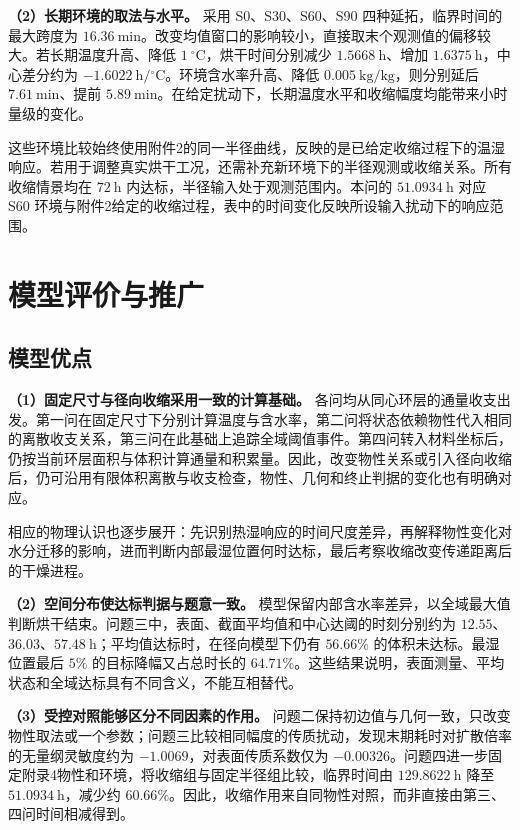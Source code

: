 \documentclass[UTF8,a4paper]{ctexart}
\begin{document}
\noindent\textbf{（2）长期环境的取法与水平。}
采用 S0、S30、S60、S90 四种延拓，临界时间的最大跨度为 \(16.36~\mathrm{min}\)。改变均值窗口的影响较小，直接取末个观测值的偏移较大。若长期温度升高、降低 \(1~^\circ\mathrm C\)，烘干时间分别减少 \(1.5668~\mathrm h\)、增加 \(1.6375~\mathrm h\)，中心差分约为 \(-1.6022~\mathrm{h/{}^\circ C}\)。环境含水率升高、降低 \(0.005~\mathrm{kg/kg}\)，则分别延后 \(7.61~\mathrm{min}\)、提前 \(5.89~\mathrm{min}\)。在给定扰动下，长期温度水平和收缩幅度均能带来小时量级的变化。

这些环境比较始终使用附件2的同一半径曲线，反映的是已给定收缩过程下的温湿响应。若用于调整真实烘干工况，还需补充新环境下的半径观测或收缩关系。所有收缩情景均在 \(72~\mathrm h\) 内达标，半径输入处于观测范围内。本问的 \(51.0934~\mathrm h\) 对应 S60 环境与附件2给定的收缩过程，表中的时间变化反映所设输入扰动下的响应范围。
\section{模型评价与推广}

\subsection{模型优点}

\noindent\textbf{（1）固定尺寸与径向收缩采用一致的计算基础。}
各问均从同心环层的通量收支出发。第一问在固定尺寸下分别计算温度与含水率，第二问将状态依赖物性代入相同的离散收支关系，第三问在此基础上追踪全域阈值事件。第四问转入材料坐标后，仍按当前环层面积与体积计算通量和积累量。因此，改变物性关系或引入径向收缩后，仍可沿用有限体积离散与收支检查，物性、几何和终止判据的变化也有明确对应。

相应的物理认识也逐步展开：先识别热湿响应的时间尺度差异，再解释物性变化对水分迁移的影响，进而判断内部最湿位置何时达标，最后考察收缩改变传递距离后的干燥进程。

\noindent\textbf{（2）空间分布使达标判据与题意一致。}
模型保留内部含水率差异，以全域最大值判断烘干结束。问题三中，表面、截面平均值和中心达阈的时刻分别约为 \(12.55\)、\(36.03\)、\(57.48~\mathrm h\)；平均值达标时，在径向模型下仍有 \(56.66\%\) 的体积未达标。最湿位置最后 \(5\%\) 的目标降幅又占总时长的 \(64.71\%\)。这些结果说明，表面测量、平均状态和全域达标具有不同含义，不能互相替代。

\noindent\textbf{（3）受控对照能够区分不同因素的作用。}
问题二保持初边值与几何一致，只改变物性取法或一个参数；问题三比较相同幅度的传质扰动，发现末期耗时对扩散倍率的无量纲灵敏度约为 \(-1.0069\)，对表面传质系数仅为 \(-0.00326\)。问题四进一步固定附录4物性和环境，将收缩组与固定半径组比较，临界时间由 \(129.8622~\mathrm h\) 降至 \(51.0934~\mathrm h\)，减少约 \(60.66\%\)。因此，收缩作用来自同物性对照，而非直接由第三、四问时间相减得到。
\end{document}
